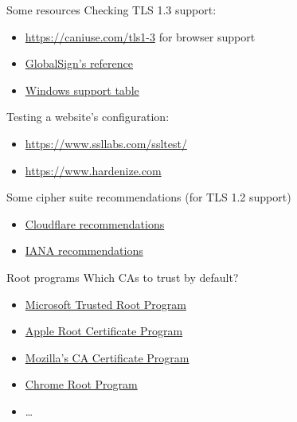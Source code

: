 \begin{frame}{Some resources}
  Checking TLS 1.3 support:
  \begin{itemize}
    \item {\small\url{https://caniuse.com/tls1-3}} for browser support
    \item \href{https://support.globalsign.com/ssl/general-ssl/tls-protocol-compatibility}{GlobalSign's reference}
    \item \href{https://learn.microsoft.com/en-us/windows/win32/secauthn/protocols-in-tls-ssl--schannel-ssp-}{Windows support table}
  \end{itemize}

  \pause
  Testing a website's configuration:
  \begin{itemize}
    \item {\small\url{https://www.ssllabs.com/ssltest/}}
    \item {\small\url{https://www.hardenize.com}}
  \end{itemize}

  \pause
  Some cipher suite recommendations (for TLS 1.2 support)
  \begin{itemize}
    \item \href{https://developers.cloudflare.com/ssl/reference/cipher-suites/recommendations/}{Cloudflare recommendations}
    \item \href{https://www.iana.org/assignments/tls-parameters/tls-parameters.xhtml?ref=hackernoon.com\#tls-parameters-4}{IANA recommendations}
  \end{itemize}
\end{frame}

\begin{frame}{Root programs}
  \pause
  Which CAs to trust by default?
  \begin{itemize}[<+(1)->]
    \item \href{https://aka.ms/RootCert}{Microsoft Trusted Root Program}
    \item \href{https://www.apple.com/certificateauthority/ca_program.html}{Apple Root Certificate Program}
    \item \href{https://wiki.mozilla.org/CA}{Mozilla's CA Certificate Program}
    \item \href{https://g.co/chrome/root-policy}{Chrome Root Program}
    \item \dots
  \end{itemize}
\end{frame}

